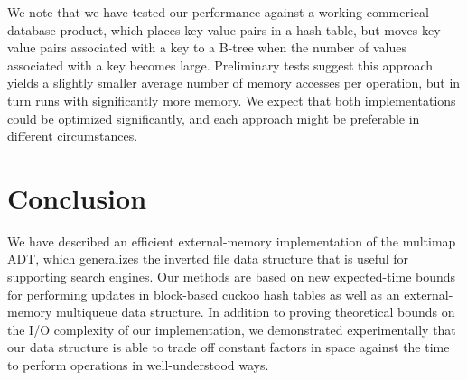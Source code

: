\documentclass[11pt,letterpaper]{article}
\begin{document}
\begin{table}[!h]
\caption{\label{tab2}I/O statistics for the deamortized implementation, for (a) overall, 
(b) for operations requiring up to 15 I/Os, (c) for operations requiring more than 15 I/Os,
(d) for insert operations, and (e) for remove operations.}
\end{table}

We note that we have tested our performance against a working
commerical database product, which places key-value pairs in a hash
table, but moves key-value pairs associated with a key to a B-tree
when the number of values associated with a key becomes large.
Preliminary tests suggest this approach yields a slightly smaller
average number of memory accesses per operation, but in turn runs with
significantly more memory.  We expect that both implementations could
be optimized significantly, and each approach might be preferable in
different circumstances.  


\section{Conclusion}
We have described an efficient external-memory
implementation of the multimap ADT, which generalizes the inverted
file data structure that is useful for supporting search engines.
Our methods are based on new expected-time bounds for performing 
updates in block-based cuckoo hash tables as well as an
external-memory multiqueue data structure. In addition to proving 
theoretical bounds on the I/O complexity of our implementation,
we demonstrated experimentally that our data structure is able to trade off 
constant factors in space against the time to
perform operations in well-understood ways.  
\end{document}
